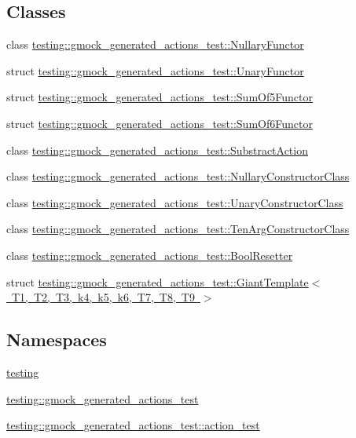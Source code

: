 \subsection*{Classes}
\begin{DoxyCompactItemize}
\item 
class \mbox{\hyperlink{classtesting_1_1gmock__generated__actions__test_1_1_nullary_functor}{testing\+::gmock\+\_\+generated\+\_\+actions\+\_\+test\+::\+Nullary\+Functor}}
\item 
struct \mbox{\hyperlink{structtesting_1_1gmock__generated__actions__test_1_1_unary_functor}{testing\+::gmock\+\_\+generated\+\_\+actions\+\_\+test\+::\+Unary\+Functor}}
\item 
struct \mbox{\hyperlink{structtesting_1_1gmock__generated__actions__test_1_1_sum_of5_functor}{testing\+::gmock\+\_\+generated\+\_\+actions\+\_\+test\+::\+Sum\+Of5\+Functor}}
\item 
struct \mbox{\hyperlink{structtesting_1_1gmock__generated__actions__test_1_1_sum_of6_functor}{testing\+::gmock\+\_\+generated\+\_\+actions\+\_\+test\+::\+Sum\+Of6\+Functor}}
\item 
class \mbox{\hyperlink{classtesting_1_1gmock__generated__actions__test_1_1_substract_action}{testing\+::gmock\+\_\+generated\+\_\+actions\+\_\+test\+::\+Substract\+Action}}
\item 
class \mbox{\hyperlink{classtesting_1_1gmock__generated__actions__test_1_1_nullary_constructor_class}{testing\+::gmock\+\_\+generated\+\_\+actions\+\_\+test\+::\+Nullary\+Constructor\+Class}}
\item 
class \mbox{\hyperlink{classtesting_1_1gmock__generated__actions__test_1_1_unary_constructor_class}{testing\+::gmock\+\_\+generated\+\_\+actions\+\_\+test\+::\+Unary\+Constructor\+Class}}
\item 
class \mbox{\hyperlink{classtesting_1_1gmock__generated__actions__test_1_1_ten_arg_constructor_class}{testing\+::gmock\+\_\+generated\+\_\+actions\+\_\+test\+::\+Ten\+Arg\+Constructor\+Class}}
\item 
class \mbox{\hyperlink{classtesting_1_1gmock__generated__actions__test_1_1_bool_resetter}{testing\+::gmock\+\_\+generated\+\_\+actions\+\_\+test\+::\+Bool\+Resetter}}
\item 
struct \mbox{\hyperlink{structtesting_1_1gmock__generated__actions__test_1_1_giant_template}{testing\+::gmock\+\_\+generated\+\_\+actions\+\_\+test\+::\+Giant\+Template$<$ T1, T2, T3, k4, k5, k6, T7, T8, T9 $>$}}
\end{DoxyCompactItemize}
\subsection*{Namespaces}
\begin{DoxyCompactItemize}
\item 
 \mbox{\hyperlink{namespacetesting}{testing}}
\item 
 \mbox{\hyperlink{namespacetesting_1_1gmock__generated__actions__test}{testing\+::gmock\+\_\+generated\+\_\+actions\+\_\+test}}
\item 
 \mbox{\hyperlink{namespacetesting_1_1gmock__generated__actions__test_1_1action__test}{testing\+::gmock\+\_\+generated\+\_\+actions\+\_\+test\+::action\+\_\+test}}
\end{DoxyCompactItemize}
